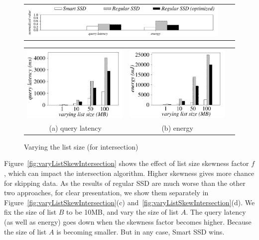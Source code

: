 \begin{figure}[tbp]
  \centering
    \begin{tabular}{ccc}
 \includegraphics[width=0.95\columnwidth]{figures/banner.pdf}
\end{tabular}
\renewcommand{\tabcolsep}{0.1mm}
  \begin{tabular}{ccc}
 \includegraphics[width=0.5\columnwidth]{figures/Intersection-time-VaryListLen-eps-converted-to.pdf}&
  \includegraphics[width=0.5\columnwidth]{figures/Intersection-energy-VaryListLen-eps-converted-to.pdf}\\
  (a) query latency & (b) energy
\end{tabular}
  \caption{Varying the list size (for intersection)}
  \label{fig:varyListSizeIntersection}
 \end{figure}

Figure~\ref{fig:varyListSkewIntersection} shows the effect of list size skewness factor $f$, which can impact the intersection algorithm.
Higher skewness gives more chance for skipping data.
As the results of regular SSD are much worse than the other two approaches, for clear presentation, we show them separately in Figure~\ref{fig:varyListSkewIntersection}(c) and~\ref{fig:varyListSkewIntersection}(d). We fix the size of list $B$ to be 10MB, and vary the size of list $A$. The query latency (as well as energy) goes down when the skewness factor becomes higher. Because the size of list $A$ is becoming smaller. But in any case, Smart SSD wins.


